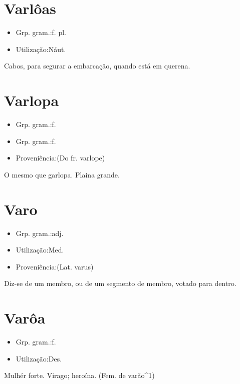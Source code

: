 \documentclass{article}
\begin{document}
\section{Varlôas}
\begin{itemize}
\item {Grp. gram.:f. pl.}
\end{itemize}
\begin{itemize}
\item {Utilização:Náut.}
\end{itemize}
Cabos, para segurar a embarcação, quando está em querena.
\section{Varlopa}
\begin{itemize}
\item {Grp. gram.:f.}
\end{itemize}
\begin{itemize}
\item {Grp. gram.:f.}
\end{itemize}
\begin{itemize}
\item {Proveniência:(Do fr. \textunderscore varlope\textunderscore )}
\end{itemize}
O mesmo que \textunderscore garlopa\textunderscore .
Plaina grande.
\section{Varo}
\begin{itemize}
\item {Grp. gram.:adj.}
\end{itemize}
\begin{itemize}
\item {Utilização:Med.}
\end{itemize}
\begin{itemize}
\item {Proveniência:(Lat. \textunderscore varus\textunderscore )}
\end{itemize}
Diz-se de um membro, ou de um segmento de membro, votado para dentro.
\section{Varôa}
\begin{itemize}
\item {Grp. gram.:f.}
\end{itemize}
\begin{itemize}
\item {Utilização:Des.}
\end{itemize}
Mulhér forte.
Virago; heroína.
(Fem. de \textunderscore varão\textunderscore ^1)
\end{document}
